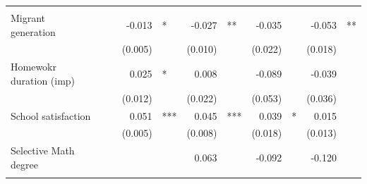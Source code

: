 \documentclass{article}
\begin{document}
\begin{table}[!h]
\begin{tabular}{lllllllllll}
  \multicolumn{1}{l}{} \\
\multicolumn{1}{l}{Migrant generation} &
  \multicolumn{1}{r}{} &
  \multicolumn{1}{l}{} &
  \multicolumn{1}{r}{-0.013} &
  \multicolumn{1}{l}{*} &
  \multicolumn{1}{r}{-0.027} &
  \multicolumn{1}{l}{**} &
  \multicolumn{1}{r}{-0.035} &
  \multicolumn{1}{l}{} &
  \multicolumn{1}{r}{-0.053} &
  \multicolumn{1}{l}{**} \\
\multicolumn{1}{l}{} &
  \multicolumn{1}{r}{} &
  \multicolumn{1}{l}{} &
  \multicolumn{1}{r}{(0.005)} &
  \multicolumn{1}{l}{} &
  \multicolumn{1}{r}{(0.010)} &
  \multicolumn{1}{l}{} &
  \multicolumn{1}{r}{(0.022)} &
  \multicolumn{1}{l}{} &
  \multicolumn{1}{r}{(0.018)} &
  \multicolumn{1}{l}{} \\
\multicolumn{1}{l}{Homewokr duration (imp)} &
  \multicolumn{1}{r}{} &
  \multicolumn{1}{l}{} &
  \multicolumn{1}{r}{0.025} &
  \multicolumn{1}{l}{*} &
  \multicolumn{1}{r}{0.008} &
  \multicolumn{1}{l}{} &
  \multicolumn{1}{r}{-0.089} &
  \multicolumn{1}{l}{} &
  \multicolumn{1}{r}{-0.039} &
  \multicolumn{1}{l}{} \\
\multicolumn{1}{l}{} &
  \multicolumn{1}{r}{} &
  \multicolumn{1}{l}{} &
  \multicolumn{1}{r}{(0.012)} &
  \multicolumn{1}{l}{} &
  \multicolumn{1}{r}{(0.022)} &
  \multicolumn{1}{l}{} &
  \multicolumn{1}{r}{(0.053)} &
  \multicolumn{1}{l}{} &
  \multicolumn{1}{r}{(0.036)} &
  \multicolumn{1}{l}{} \\
\multicolumn{1}{l}{School satisfaction} &
  \multicolumn{1}{r}{} &
  \multicolumn{1}{l}{} &
  \multicolumn{1}{r}{0.051} &
  \multicolumn{1}{l}{***} &
  \multicolumn{1}{r}{0.045} &
  \multicolumn{1}{l}{***} &
  \multicolumn{1}{r}{0.039} &
  \multicolumn{1}{l}{*} &
  \multicolumn{1}{r}{0.015} &
  \multicolumn{1}{l}{} \\
\multicolumn{1}{l}{} &
  \multicolumn{1}{r}{} &
  \multicolumn{1}{l}{} &
  \multicolumn{1}{r}{(0.005)} &
  \multicolumn{1}{l}{} &
  \multicolumn{1}{r}{(0.008)} &
  \multicolumn{1}{l}{} &
  \multicolumn{1}{r}{(0.018)} &
  \multicolumn{1}{l}{} &
  \multicolumn{1}{r}{(0.013)} &
  \multicolumn{1}{l}{} \\
\multicolumn{1}{l}{Selective Math degree} &
  \multicolumn{1}{r}{} &
  \multicolumn{1}{l}{} &
  \multicolumn{1}{r}{} &
  \multicolumn{1}{l}{} &
  \multicolumn{1}{r}{0.063} &
  \multicolumn{1}{l}{} &
  \multicolumn{1}{r}{-0.092} &
  \multicolumn{1}{l}{} &
  \multicolumn{1}{r}{-0.120} &
  \multicolumn{1}{l}{} \\
\multicolumn{1}{l}{} &
  \multicolumn{1}{r}{} &
  \multicolumn{1}{l}{} &
  \multicolumn{1}{r}{} &

\end{tabular}
\end{table}
\end{document}
